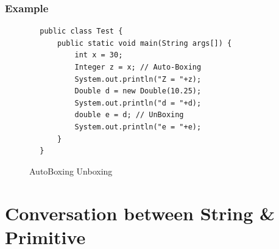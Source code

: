 \documentclass[openany]{book}  %
\begin{document}
\subsubsection{Example}
\begin{center}
    \begin{verbatim}
        public class Test {
            public static void main(String args[]) {
                int x = 30;
                Integer z = x; // Auto-Boxing
                System.out.println("Z = "+z);
                Double d = new Double(10.25);
                System.out.println("d = "+d);
                double e = d; // UnBoxing
                System.out.println("e = "+e);
            }
        }
    \end{verbatim}
\end{center}
% 
% 
\begin{figure}[htbp]
    \begin{center}
        \caption{AutoBoxing Unboxing}
    \end{center}
\end{figure}
% 
% 
\section{Conversation between String \& Primitive}
% 
% 
\end{document}
